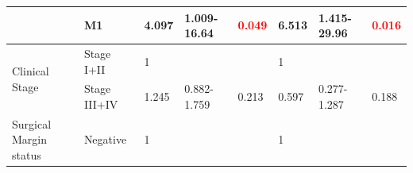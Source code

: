 \documentclass[cancers,article,submit,moreauthors,pdftex]{Definitions/mdpi}
\begin{document}
\begin{table}[hp]
{\begin{tabular}{|l|l|l|l|l|l|l|l|}
\cline{2-8}
                                        & M1                                                                                  & 4.097                                                                          & 1.009-16.64                                                                   & \textcolor{red}{0.049}                                                        & 6.513                                                                          & 1.415-29.96                                                                   & \textcolor{red}{0.016}                                                         \\ 
\hline
\multirow{2}{*}{Clinical Stage}         & {\cellcolor[rgb]{0.62,0.812,0.878}}Stage I+II                                       & {\cellcolor[rgb]{0.62,0.812,0.878}}1                                           & {\cellcolor[rgb]{0.62,0.812,0.878}}                                           & {\cellcolor[rgb]{0.62,0.812,0.878}}                                           & {\cellcolor[rgb]{0.62,0.812,0.878}}1                                           & {\cellcolor[rgb]{0.62,0.812,0.878}}                                           & {\cellcolor[rgb]{0.62,0.812,0.878}}                                            \\ 
\cline{2-8}
                                        & Stage III+IV                                                                        & 1.245                                                                          & 0.882-1.759                                                                   & 0.213                                                                         & 0.597                                                                          & 0.277-1.287                                                                   & 0.188                                                                          \\ 
\hline
\multirow{2}{*}{Surgical Margin status} & {\cellcolor[rgb]{0.62,0.812,0.878}}Negative                                         & {\cellcolor[rgb]{0.62,0.812,0.878}}1                                           & {\cellcolor[rgb]{0.62,0.812,0.878}}                                           & {\cellcolor[rgb]{0.62,0.812,0.878}}                                           & {\cellcolor[rgb]{0.62,0.812,0.878}}1                                           & {\cellcolor[rgb]{0.62,0.812,0.878}}                                           & {\cellcolor[rgb]{0.62,0.812,0.878}}                                            \\ 

\end{tabular}}
\end{table}
\end{document}
